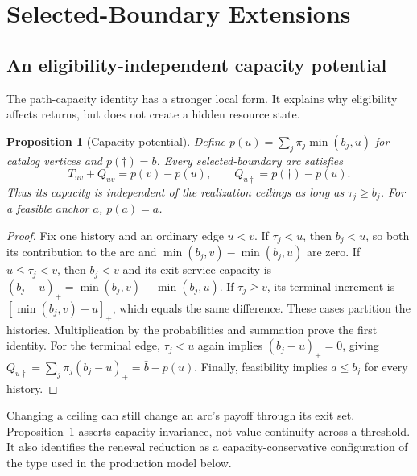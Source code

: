 \documentclass[11pt,letterpaper]{article}
\newtheorem{proposition}[theorem]{Proposition}
\theoremstyle{definition}\newtheorem{remark}[theorem]{Remark}
\begin{document}
\section{Selected-Boundary Extensions}
\subsection{An eligibility-independent capacity potential}
The path-capacity identity has a stronger local form. It explains why eligibility affects returns, but does not create a hidden resource state.
\begin{proposition}[Capacity potential]\label{prop:potential53}
Define $p(u)=\sum_j\pi_j\min(b_j,u)$ for catalog vertices and $p(\dagger)=\bar b$. Every selected-boundary arc satisfies
\begin{equation}\label{eq:potential53}
 T_{uv}+Q_{uv}=p(v)-p(u),\qquad Q_{u\dagger}=p(\dagger)-p(u).
\end{equation}
Thus its capacity is independent of the realization ceilings as long as $\tau_j\geq b_j$. For a feasible anchor $a$, $p(a)=a$.
\end{proposition}
\begin{proof}
Fix one history and an ordinary edge $u<v$. If $\tau_j<u$, then $b_j<u$, so both its contribution to the arc and $\min(b_j,v)-\min(b_j,u)$ are zero. If $u\leq\tau_j<v$, then $b_j<v$ and its exit-service capacity is $(b_j-u)_+=\min(b_j,v)-\min(b_j,u)$. If $\tau_j\geq v$, its terminal increment is $[\min(b_j,v)-u]_+$, which equals the same difference. These cases partition the histories. Multiplication by the probabilities and summation prove the first identity. For the terminal edge, $\tau_j<u$ again implies $(b_j-u)_+=0$, giving $Q_{u\dagger}=\sum_j\pi_j(b_j-u)_+=\bar b-p(u)$. Finally, feasibility implies $a\leq b_j$ for every history.
\end{proof}
Changing a ceiling can still change an arc's payoff through its exit set. Proposition~\ref{prop:potential53} asserts capacity invariance, not value continuity across a threshold. It also identifies the renewal reduction as a capacity-conservative configuration of the type used in the production model below.
\end{document}
